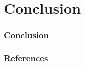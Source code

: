\documentclass{beamer}
\begin{document}
\section{Conclusion}
\begin{frame}
\frametitle{Conclusion}
\end{frame}

\begin{frame}
\frametitle{References}


\end{frame}
\end{document}
